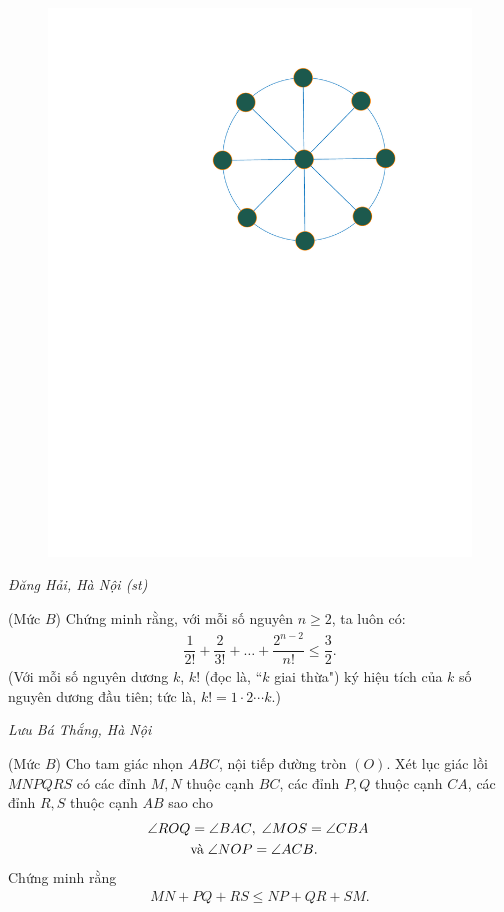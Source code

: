 \begin{multicols}{2}
\begin{figure}[H]
		\includegraphics[width=0.68\linewidth]{P634}
		\vspace*{-5pt}
	\end{figure}
	\begin{flushright}
		\textit{Đăng Hải, Hà Nội (st)}
	\end{flushright}
	{}
	(Mức $B$) Chứng minh rằng, với mỗi số nguyên $n\ge2$, ta luôn có:
	\begin{align*}
		\dfrac{1}{2!}+\dfrac{2}{3!}+\ldots+\dfrac{2^{n-2}}{n!}\le\dfrac{3}{2}.
	\end{align*}
	(Với mỗi số nguyên dương $k$, $k!$ (đọc là, ``$k$ giai thừa") ký hiệu tích của $k$ số nguyên dương đầu tiên; tức là, $k!=1\cdot2\cdots k$.)
	\begin{flushright}
		\textit{Lưu Bá Thắng, Hà Nội}
	\end{flushright}
	{}
	(Mức $B$) Cho tam giác nhọn $ABC$, nội tiếp đường tròn $(O)$. Xét lục giác lồi $MNPQRS$ có các đỉnh $M, N$ thuộc cạnh $BC$, các đỉnh $P, Q$ thuộc cạnh $CA$, các đỉnh $R, S$ thuộc cạnh $AB$ sao cho
	\begin{align*}
		\angle{ROQ} &=\angle{BAC},\; \angle{MOS} =\angle{CBA}\;\\
		&\text{\color{black}và}\;\angle{NOP }= \angle{ACB}.
	\end{align*}
	Chứng minh rằng 
	\begin{align*}
		MN + PQ + RS \leq NP + QR + SM.

\end{align*}
\end{multicols}
